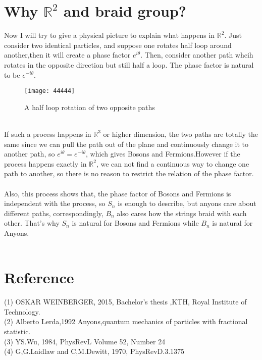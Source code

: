 \documentclass[UTF8]{ctexart}
\theoremstyle{definition}
\theoremstyle{remark}
\begin{document}
\section{Why $\mathbb{R}^2$ and braid group?}
Now I will try to give a physical picture to explain what happens in $\mathbb{R}^2$. Just consider two identical particles, and suppose one rotates half loop around another,then it will create a phase factor $e^{i\theta}$. Then, consider another path whcih rotates in the opposite direction but still half a loop. The phase factor is natural to be $e^{-i\theta}$. 
\begin{figure}[h]
	\centering
	\texttt{[image: 44444]}
	\caption{A half loop rotation of two opposite paths}
\end{figure}
\\If such a process happens in $\mathbb{R}^{3}$ or higher dimension, the two paths are totally the same since we can pull the path out of the plane and continuously change it to another path, so $e^{i\theta}=e^{-i\theta}$, which gives Bosons and Fermions.However if the process happens exactly in $\mathbb{R}^2$, we can not find a continuous way to change one path to another, so there is no reason to  restrict the relation of the phase factor.\\\\Also, this process shows that, the phase factor of Bosons and Fermions is independent with the process, so $S_n$ is enough to describe, but anyons care about different paths, correspondingly, $B_n$ also cares how the strings braid with each other. That's why $S_n$ is natural for Bosons and Fermions while $B_n$ is natural for Anyons. \\\\\section*{Reference}
(1) OSKAR WEINBERGER, 2015, Bachelor’s thesis ,KTH, Royal Institute of Technology.
\\
(2) Alberto Lerda,1992 Anyons,quantum mechanics of particles with fractional statistic.\\
(3) YS.Wu, 1984, PhysRevL Volume 52, Number 24\\
(4) G,G.Laidlaw and C,M.Dewitt, 1970, PhysRevD.3.1375
\end{document}
